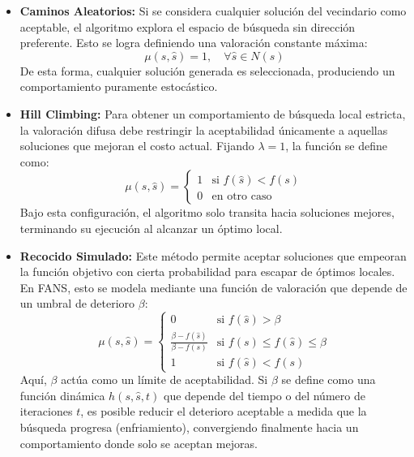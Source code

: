 \begin{itemize}
    \item \textbf{Caminos Aleatorios:}
    Si se considera cualquier solución del vecindario como aceptable, el algoritmo explora el espacio de búsqueda sin dirección preferente. Esto se logra definiendo una valoración constante máxima:
    \begin{equation}
        \mu(s, \hat{s}) = 1, \quad \forall \hat{s} \in N(s)
    \end{equation}
    De esta forma, cualquier solución generada es seleccionada, produciendo un comportamiento puramente estocástico.

    \item \textbf{Hill Climbing:}
    Para obtener un comportamiento de búsqueda local estricta, la valoración difusa debe restringir la aceptabilidad únicamente a aquellas soluciones que mejoran el costo actual. Fijando $\lambda = 1$, la función se define como:
    \begin{equation}
        \mu(s, \hat{s}) = 
        \begin{cases} 
            1 & \text{si } f(\hat{s}) < f(s) \\
            0 & \text{en otro caso}
        \end{cases}
    \end{equation}
    Bajo esta configuración, el algoritmo solo transita hacia soluciones mejores, terminando su ejecución al alcanzar un óptimo local.

    \item \textbf{Recocido Simulado:}
    Este método permite aceptar soluciones que empeoran la función objetivo con cierta probabilidad para escapar de óptimos locales. En FANS, esto se modela mediante una función de valoración que depende de un umbral de deterioro $\beta$:
    \begin{equation}
        \mu(s, \hat{s}) = 
        \begin{cases} 
            0 & \text{si } f(\hat{s}) > \beta \\
            \frac{\beta - f(\hat{s})}{\beta - f(s)} & \text{si } f(s) \le f(\hat{s}) \le \beta \\
            1 & \text{si } f(\hat{s}) < f(s)
        \end{cases}
    \end{equation}
    Aquí, $\beta$ actúa como un límite de aceptabilidad. Si $\beta$ se define como una función dinámica $h(s, \hat{s}, t)$ que depende del tiempo o del número de iteraciones $t$, es posible reducir el deterioro aceptable a medida que la búsqueda progresa (enfriamiento), convergiendo finalmente hacia un comportamiento donde solo se aceptan mejoras.
\end{itemize}


